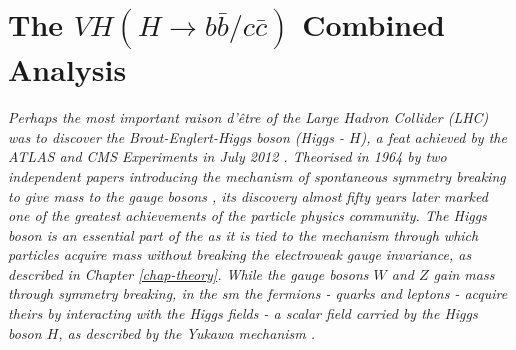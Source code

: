 \chapter{The $VH (H \rightarrow b\bar{b}/c\bar{c})$ Combined Analysis}\label{chap-VH}
\ChapFrame

\textit{Perhaps the most important \textit{raison d'être} of the \textit{Large Hadron Collider} (LHC) was to discover the Brout-Englert-Higgs boson (Higgs - $H$), a feat achieved by the ATLAS and CMS Experiments in July 2012 \cite{ATLAS:2012yve, CMS:2012qbp}. Theorised in 1964 by two independent papers introducing the mechanism of spontaneous symmetry breaking to give mass to the gauge bosons \cite{Englert:1964et,  PhysRevLett.13.508}, its discovery almost fifty years later marked one of the greatest achievements of the particle physics community. The Higgs boson is an essential part of the  as it is tied to the mechanism through which particles acquire mass without breaking the electroweak gauge invariance, as described in Chapter \ref{chap-theory}. While the gauge bosons $W$ and $Z$ gain mass through symmetry breaking, in the \gls{sm} the fermions - quarks and leptons - acquire theirs by interacting with the Higgs fields -  a scalar field carried by the Higgs boson $H$, as described by the Yukawa mechanism \cite{10.1143/PTPS.1.1}.}\\

